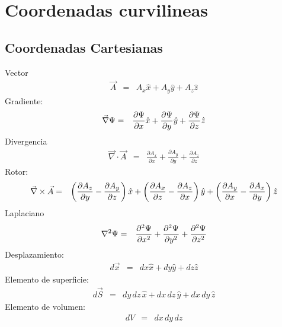 \chapter{Coordenadas curvilineas}

\section{Coordenadas Cartesianas}
\noindent Vector
\begin{eqnarray}
\vec{A}
&=& A_x{\hat x} + A_y {\hat y} + A_z {\hat z}
\end{eqnarray}
Gradiente:
\begin{eqnarray}
 \vec\nabla\Psi&=&{\partial\Psi\over \partial x} {\hat x} + {\partial\Psi\over
\partial y} {\hat y}   + {\partial\Psi\over \partial z} {\hat z}
\end{eqnarray}
Divergencia
\begin{eqnarray}
 \vec\nabla \cdot \vec{A}
&=& \frac{\partial  A_x}{\partial x}+\frac{\partial  A_y}{\partial y}+\frac{\partial  A_z}{\partial z}
\end{eqnarray}
Rotor:
\begin{eqnarray}
\vec\nabla \times  \vec{A}
&=&   \left({\partial A_z \over \partial y} - {\partial A_y \over
\partial z}\right)  {\hat x}  +
   \left({\partial A_x \over \partial z} - {\partial A_z \over
\partial x}\right)  {\hat y}  +
   \left({\partial A_y \over \partial x} - {\partial A_x \over
\partial y}\right)  {\hat z}
\end{eqnarray}
Laplaciano
\begin{eqnarray}
 \nabla^2 \Psi
&=& {\partial^2\Psi\over \partial x^2} + {\partial^2\Psi\over \partial y^2} +
{\partial^2\Psi\over \partial z^2}
\end{eqnarray}
Desplazamiento:
\begin{eqnarray}
 d \vec{x} &=& dx {\hat x} + dy {\hat y} + dz {\hat z}
\end{eqnarray}
Elemento de superficie:
\begin{eqnarray}
 d \vec{S} &=& dy\,dz\, {\hat x} + dx\,dz\, {\hat y} +
dx\,dy\, {\hat z}
\end{eqnarray}
Elemento de volumen:
\begin{eqnarray}
 dV &=& dx\,dy\,dz
\end{eqnarray}

